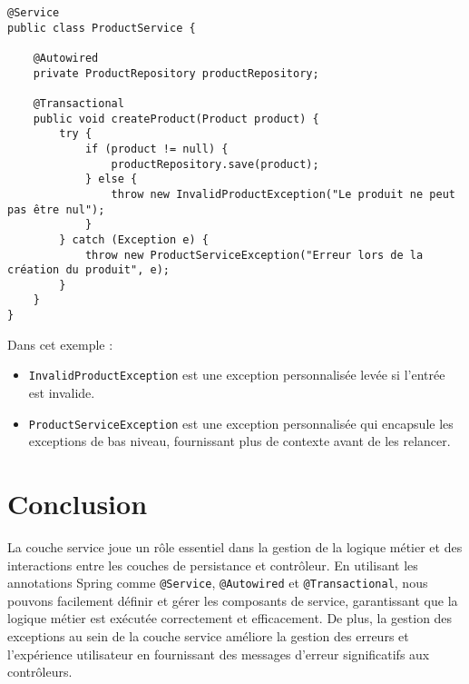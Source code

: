 \documentclass{article}
\begin{document}
\begin{lstlisting}[caption={Gestion Personnalisée des Exceptions dans la Couche Service}]
@Service
public class ProductService {

    @Autowired
    private ProductRepository productRepository;

    @Transactional
    public void createProduct(Product product) {
        try {
            if (product != null) {
                productRepository.save(product);
            } else {
                throw new InvalidProductException("Le produit ne peut pas être nul");
            }
        } catch (Exception e) {
            throw new ProductServiceException("Erreur lors de la création du produit", e);
        }
    }
}
\end{lstlisting}

Dans cet exemple :

\begin{itemize}
    \item \texttt{InvalidProductException} est une exception personnalisée levée si l'entrée est invalide.
    \item \texttt{ProductServiceException} est une exception personnalisée qui encapsule les exceptions de bas niveau, fournissant plus de contexte avant de les relancer.
\end{itemize}

\section{Conclusion}
La couche service joue un rôle essentiel dans la gestion de la logique métier et des interactions entre les couches de persistance et contrôleur. En utilisant les annotations Spring comme \texttt{@Service}, \texttt{@Autowired} et \texttt{@Transactional}, nous pouvons facilement définir et gérer les composants de service, garantissant que la logique métier est exécutée correctement et efficacement. De plus, la gestion des exceptions au sein de la couche service améliore la gestion des erreurs et l'expérience utilisateur en fournissant des messages d'erreur significatifs aux contrôleurs.
\end{document}
